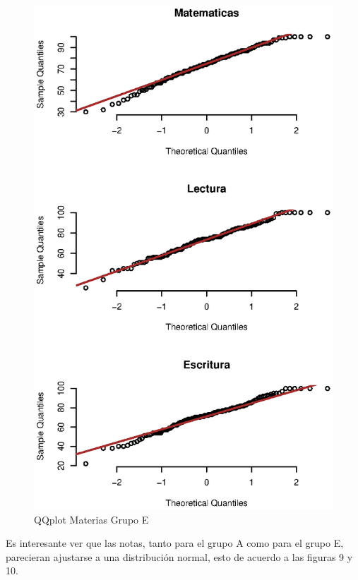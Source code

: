 \documentclass{article}
\begin{document}
\begin{figure}[H]
        \hspace{0.2cm}
        \begin{minipage}[b]{0.45\linewidth}
            \includegraphics[scale = 0.4]{Output/Plots/qqE.eps}
            \vspace*{-6mm}
            \caption{QQplot Materias Grupo E}
            \label{fig:minipage2}
        \end{minipage}
    \end{figure}

    Es interesante ver que las notas, tanto para el grupo A como para el grupo E, parecieran
    ajustarse a una distribuci\'on normal, esto de acuerdo a las figuras 9 y 10.
\end{document}
